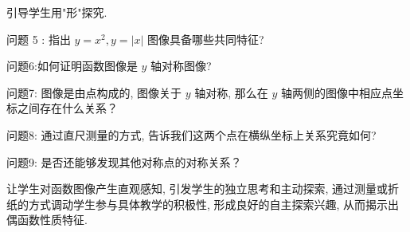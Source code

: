 \begin{activity}
	引导学生用"形"探究.

	问题 5 : 指出 $y=x^{2}, y=|x|$ 图像具备哪些共同特征?

	问题6:如何证明函数图像是 $y$ 轴对称图像?

	问题7: 图像是由点构成的, 图像关于 $y$ 轴对称, 那么在 $y$ 轴两侧的图像中相应点坐标之间存在什么关系？

	问题8: 通过直尺测量的方式, 告诉我们这两个点在横纵坐标上关系究竟如何?

	问题9: 是否还能够发现其他对称点的对称关系？
\end{activity}
\begin{purpose}
	让学生对函数图像产生直观感知, 引发学生的独立思考和主动探索, 通过测量或折纸的方式调动学生参与具体教学的积极性, 形成良好的自主探索兴趣, 从而揭示出偶函数性质特征.
\end{purpose}

